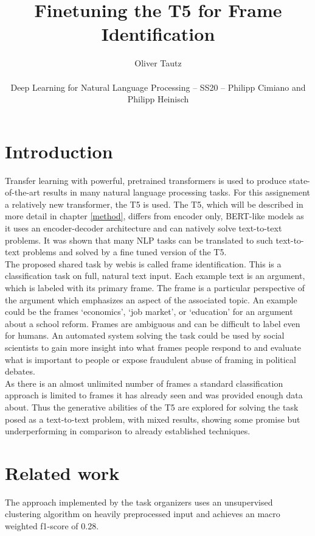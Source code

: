 \documentclass[11pt,a4paper,onecolumn,oneside,notitlepage]{article}
\author{Oliver Tautz\\
	\begin{small}
		Deep Learning for Natural Language Processing -- SS20 -- Philipp Cimiano and Philipp Heinisch
	\end{small}
}
\title{Finetuning the T5 for Frame Identification}
\begin{document}
	\maketitle
	
	\section{Introduction}
Transfer learning with powerful, pretrained transformers is used to produce state-of-the-art results in many natural language processing tasks. For this assignement a relatively new transformer, the T5 \citep{T5} is used. The T5, which will be described in more detail in chapter \ref{method}, differs from encoder only, BERT-like \citep{bert} models as it uses an encoder-decoder architecture and can natively solve text-to-text problems. It was shown that many NLP tasks can be translated to such text-to-text problems and solved by a fine tuned version of the T5.\citep{T5}\\


The proposed shared task by webis \citep{webis_task} is called frame identification. This is a classification task on full, natural text input. Each example text is an argument, which is labeled with its primary frame. The frame is a particular perspective of the argument which emphasizes an aspect of the associated topic. An example could be the frames ‘economics’, ‘job market’, or ‘education’ for an argument about a school reform. Frames are ambiguous and can be difficult to label even for humans. An automated system solving the task could be used by social scientists to gain more insight into what frames people respond to and evaluate what is important to people or expose fraudulent abuse of framing in political debates.\\

As there is an almost unlimited number of frames a standard classification approach is limited to frames it has already seen and was provided enough data about. Thus the generative abilities of the T5 are explored for solving the task posed as a text-to-text problem, with mixed results, showing some promise but underperforming in comparison to already established techniques. 

		
\section{Related work}
The approach implemented by the task organizers \citep{webis_task_paper} uses an unsupervised clustering algorithm on heavily preprocessed input and achieves an macro weighted f1-score of \num{0.28}.\\
\end{document}

